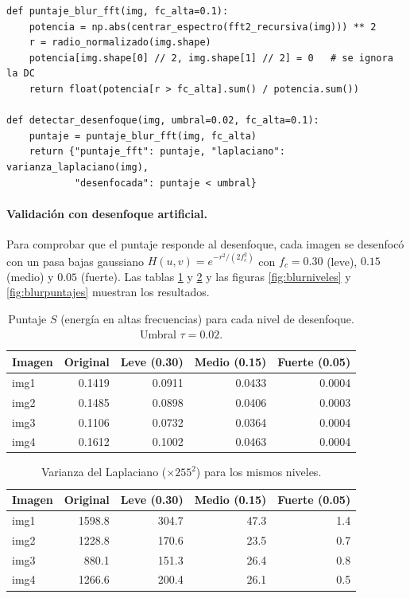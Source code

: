 \documentclass[11pt]{article}
\begin{document}
\begin{lstlisting}
def puntaje_blur_fft(img, fc_alta=0.1):
    potencia = np.abs(centrar_espectro(fft2_recursiva(img))) ** 2
    r = radio_normalizado(img.shape)
    potencia[img.shape[0] // 2, img.shape[1] // 2] = 0   # se ignora la DC
    return float(potencia[r > fc_alta].sum() / potencia.sum())

def detectar_desenfoque(img, umbral=0.02, fc_alta=0.1):
    puntaje = puntaje_blur_fft(img, fc_alta)
    return {"puntaje_fft": puntaje, "laplaciano": varianza_laplaciano(img),
            "desenfocada": puntaje < umbral}
\end{lstlisting}

\paragraph{Validación con desenfoque artificial.}
Para comprobar que el puntaje responde al desenfoque, cada imagen se desenfocó con un pasa bajas gaussiano
$H(u,v)=e^{-r^2/(2f_c^2)}$ con $f_c=0.30$ (leve), $0.15$ (medio) y $0.05$ (fuerte). Las tablas \ref{tab:blur} y \ref{tab:lap}
y las figuras \ref{fig:blurniveles} y \ref{fig:blurpuntajes} muestran los resultados.

\begin{table}[!htbp]
\centering
\caption{Puntaje $S$ (energía en altas frecuencias) para cada nivel de desenfoque. Umbral $\tau=0.02$.}
\label{tab:blur}
\begin{tabular}{lrrrr}
\hline
\rowcolor{pastelblue}
Imagen & Original & Leve (0.30) & Medio (0.15) & Fuerte (0.05)\\
\hline
img1 & 0.1419 & 0.0911 & 0.0433 & 0.0004\\
img2 & 0.1485 & 0.0898 & 0.0406 & 0.0003\\
img3 & 0.1106 & 0.0732 & 0.0364 & 0.0004\\
img4 & 0.1612 & 0.1002 & 0.0463 & 0.0004\\
\hline
\end{tabular}
\end{table}

\begin{table}[!htbp]
\centering
\caption{Varianza del Laplaciano ($\times255^2$) para los mismos niveles.}
\label{tab:lap}
\begin{tabular}{lrrrr}
\hline
\rowcolor{pastelblue}
Imagen & Original & Leve (0.30) & Medio (0.15) & Fuerte (0.05)\\
\hline
img1 & 1598.8 & 304.7 & 47.3 & 1.4\\
img2 & 1228.8 & 170.6 & 23.5 & 0.7\\
img3 & 880.1 & 151.3 & 26.4 & 0.8\\
img4 & 1266.6 & 200.4 & 26.1 & 0.5\\
\hline
\end{tabular}
\end{table}
\end{document}

